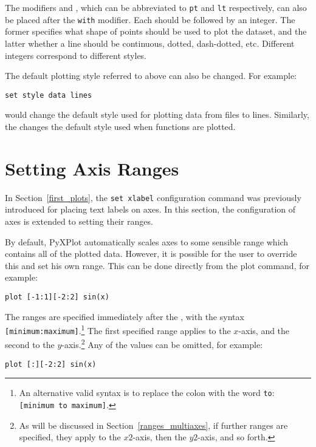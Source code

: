 \label{pointtype_modifier}
The modifiers  and , which can be
abbreviated to {\tt pt} and {\tt lt} respectively, can also be placed after the
{\tt with} modifier. Each should be followed by an integer.  The former
specifies what shape of points should be used to plot the dataset, and the
latter whether a line should be continuous, dotted, dash-dotted, etc.
Different integers correspond to different styles.

The default plotting style referred to above can also be changed.  For example:

\begin{verbatim}
set style data lines
\end{verbatim}

\noindent would change the default style used for plotting data from files to
lines. Similarly, the  changes the default style
used when functions are plotted.

\section{Setting Axis Ranges}

In Section~\ref{first_plots}, the {\tt set xlabel} configuration command was
previously introduced for placing text labels on axes. In this section, the
configuration of axes is extended to setting their ranges.

By default, PyXPlot automatically scales axes to some sensible range which
contains all of the plotted data. However, it is possible for the user to
override this and set his own range. This can be
done directly from the plot command, for example:

\begin{verbatim}
plot [-1:1][-2:2] sin(x)
\end{verbatim}
\label{plot_ranges}

\noindent The ranges are specified immediately after the , with
the syntax {\tt [minimum:maximum]}.\footnote{An alternative valid syntax is to
replace the colon with the word {\tt to}: {\tt [minimum to maximum]}.} The
first specified range applies to the $x$-axis, and the second to the
$y$-axis.\footnote{As will be discussed in Section~\ref{ranges_multiaxes}, if
further ranges are specified, they apply to the $x2$-axis, then the $y2$-axis,
and so forth.} Any of the values can be omitted, for example:

\begin{verbatim}
plot [:][-2:2] sin(x)
\end{verbatim}

